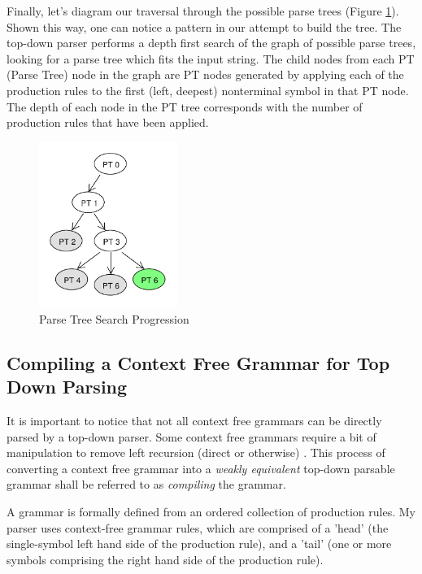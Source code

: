 \documentclass[11pt]{article}
\begin{document}
Finally, let's diagram our traversal through the possible parse trees (Figure \ref{fig:rdp_7}). Shown this way, one can notice
a pattern in our attempt to build the tree. The top-down parser performs a depth first search of the 
graph of possible parse trees, looking for a parse tree which fits the input string.
The child nodes from each PT (Parse Tree) node in the graph are PT nodes generated by
applying each of the production rules to the first (left, deepest) nonterminal symbol in that PT node.
The depth of each node in the PT tree corresponds with the number of production rules that have been applied.

\begin{figure}[h!]
    \centering
    \includegraphics[width=0.4\textwidth,natwidth=30,natheight=30]{umlet/rdp_7.pdf}
    \caption{Parse Tree Search Progression}
    \label{fig:rdp_7}
\end{figure}

\clearpage

\subsection{Compiling a Context Free Grammar for Top Down Parsing}

It is important to notice that not all context free grammars can be directly parsed by a
top-down parser. Some context free grammars require a bit of manipulation to remove
left recursion (direct or otherwise) \cite{compiler}. This process of converting a context
free grammar into a {\em weakly equivalent} top-down parsable grammar shall be referred to as
{\em compiling} the grammar.

A grammar is formally defined from an ordered collection of production rules.
My parser uses context-free grammar rules, which are comprised of a
'head' (the single-symbol left hand side of the production rule), and a 'tail'
(one or more symbols comprising the right hand side of the production rule).
\end{document}
